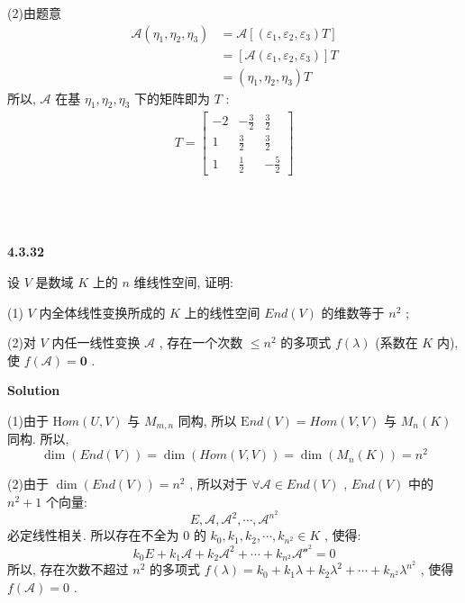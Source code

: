\documentclass[11pt,a4paper,openany,oneside]{book}
\newcommand{\Hom}{\mathrm Hom}
\newcommand{\End}{\mathrm End}
\newcommand\Solution{\noindent\textbf{\textsf{Solution}}\par\medskip}
\begin{document}
(2)由题意
\begin{align*}
\mathcal{A}(\eta_1, \eta_2, \eta_3) &= \mathcal{A}[(\varepsilon_1, \varepsilon_2, \varepsilon_3)T]  \\ 
&=[\mathcal{A}(\varepsilon_1, \varepsilon_2, \varepsilon_3)]T  \\
&=(\eta_1, \eta_2, \eta_3)T
\end{align*}
所以,  $ \mathcal{A} $ 在基 $ \eta_1, \eta_2, \eta_3 $ 下的矩阵即为 $ T $ :
\begin{gather*}
T=
\begin{bmatrix}
-2  &  -\frac{3}{2}  &  \frac{3}{2}  \\
1  &  \frac{3}{2}    &  \frac{3}{2}  \\
1  &  \frac{1}{2}    &  -\frac{5}{2}
\end{bmatrix}
\end{gather*} \\  \\  \\


\begin{myexample}
	\textbf{4.3.32}

设 $ V $ 是数域 $ K $ 上的 $ n $ 维线性空间, 证明:

(1) $ V $ 内全体线性变换所成的 $ K $ 上的线性空间 $ End(V) $ 的维数等于 $ n^2 $ ;

(2)对 $ V $ 内任一线性变换 $ \mathcal{A} $ , 存在一个次数 $ \leq n^2 $ 的多项式 $ f(\lambda) $ (系数在 $ K $ 内), 使 $ f(\mathcal{A}) = \textbf{0} $ . \\  

\end{myexample}
\Solution

(1)由于 $ \Hom(U,V) $ 与 $ M_{m,n} $ 同构, 所以 $ \End(V) = Hom(V,V) $ 与 $ M_n(K) $ 同构. 所以,
 $$  \dim (End(V)) = \dim (Hom(V,V)) = \dim (M_n(K)) = n^2  $$ 

(2)由于 $ \dim (End(V))= n^2 $ , 所以对于 $ \forall \mathcal{A} \in End(V) $ ,  $ End(V) $ 中的 $ n^2+1 $ 个向量:
 $$  E, \mathcal{A}, \mathcal{A}^2, \cdots, \mathcal{A}^{n^2}  $$ 
必定线性相关. 所以存在不全为 $ 0 $ 的 $ k_0, k_1, k_2, \cdots, k_{n^2} \in K $ , 使得:
 $$  k_0E + k_1\mathcal{A} + k_2\mathcal{A}^2 + \cdots + k_{n^2}\mathcal{A^{n^2}} = 0   $$ 
所以, 存在次数不超过 $ n^2 $ 的多项式 $ f(\lambda) = k_0 + k_1\lambda + k_2\lambda^2 + \cdots + k_{n^2}\lambda^{n^2} $ , 使得 $ f(\mathcal{A}) = 0 $ . \\  \\  \\
\end{document}
